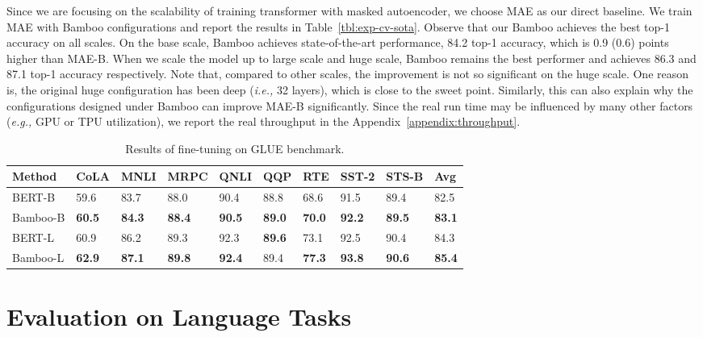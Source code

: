 \documentclass{article}
\theoremstyle{plain}
\theoremstyle{definition}
\theoremstyle{remark}
\newcommand{\ie}{\emph{i.e.,}\xspace}
\newcommand{\eg}{\emph{e.g.,}\xspace}
\begin{document}
Since we are focusing on the scalability of training transformer with masked autoencoder, we choose MAE as our direct baseline. We train MAE with Bamboo configurations and report the results in Table~\ref{tbl:exp-cv-sota}. Observe that our Bamboo achieves the best top-1 accuracy on all scales. On the base scale, Bamboo achieves state-of-the-art performance, 84.2 top-1 accuracy, which is 0.9 (0.6) points higher than MAE-B. When we scale the model up to large scale and huge scale, Bamboo remains the best performer and achieves 86.3 and 87.1 top-1 accuracy respectively. Note that, compared to other scales, the improvement is not so significant on the huge scale. One reason is, the original huge configuration has been deep (\ie 32 layers), which is close to the sweet point. Similarly, this can also explain why the configurations designed under Bamboo can improve MAE-B significantly. Since the real run time may be influenced by many other factors (\eg GPU or TPU utilization), we report the real throughput in the Appendix~\ref{appendix:throughput}.


\begin{table*}[t]
\caption{Results of fine-tuning on GLUE benchmark. }
\vspace{-0.5cm}
\label{nlp:table:main}
\small
\begin{center}
\begin{tabular}{l llllllll l}

\toprule
Method                   & CoLA & MNLI & MRPC & QNLI & QQP & RTE & SST-2  & STS-B & Avg \\ \midrule
BERT-B   & 59.6 & 83.7 & 88.0 & 90.4 & 88.8 &  68.6  & 91.5 & 89.4 & 82.5 \\ 
Bamboo-B   & \textbf{60.5} & \textbf{84.3} & \textbf{88.4} & \textbf{90.5} & \textbf{89.0} & \textbf{70.0} &  \textbf{92.2}  & \textbf{89.5} & \textbf{83.1} \\  \midrule
BERT-L   & 60.9 & 86.2 & 89.3 & 92.3 & \textbf{89.6} &  73.1  & 92.5 & 90.4 & 84.3 \\
Bamboo-L   & \textbf{62.9} & \textbf{87.1} & \textbf{89.8} & \textbf{92.4} & 89.4 &  \textbf{77.3}  & \textbf{93.8} & \textbf{90.6} & \textbf{85.4} \\ 
\bottomrule
\end{tabular}
\vspace{-0.4cm}
\end{center}
\end{table*}


\section{Evaluation on Language Tasks}\label{Evaluation Language}
\end{document}
